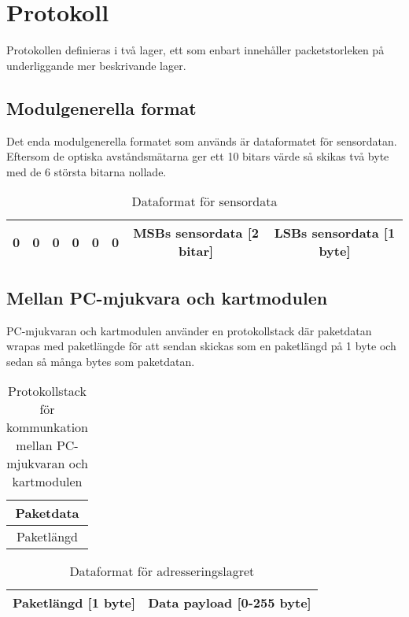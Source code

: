 \section{Protokoll}
Protokollen definieras i två lager, ett som enbart innehåller packetstorleken 
på underliggande mer beskrivande lager. 
\subsection{Modulgenerella format}
Det enda modulgenerella formatet som används är dataformatet för sensordatan.
Eftersom de optiska avståndsmätarna ger ett 10 bitars värde så skikas två byte
med de 6 största bitarna nollade.

\begin{table}[H]
	\caption{Dataformat för sensordata}
	\begin{center}
	\begin{tabular}{| c | c | c | c | c | c | c | c |} \hline
		0 & 0 & 0 & 0 & 0 & 0 &
		MSBs sensordata [2 bitar] & LSBs sensordata  [1 byte] \\ \hline
	\end{tabular}
	\end{center}
\end{table}

\subsection{Mellan PC-mjukvara och kartmodulen}
PC-mjukvaran och kartmodulen använder en protokollstack där paketdatan wrapas
med paketlängde för att sendan skickas som en paketlängd på 1 byte och
sedan så många bytes som paketdatan.

\begin{table}[H]
	\caption{Protokollstack för kommunkation mellan PC-mjukvaran
	och kartmodulen}
	\begin{center}
	\begin{tabular}{| c |} \hline
		Paketdata \\ \hline
		Paketlängd \\ \hline
	\end{tabular}
	\end{center}
\end{table}

\begin{table}[H]
	\caption{Dataformat för adresseringslagret}
	\begin{center}
	\begin{tabular}{| c | c |} \hline
		Paketlängd [1 byte] & Data payload [0-255 byte] \\ \hline
	\end{tabular}
	\end{center}
\end{table}

